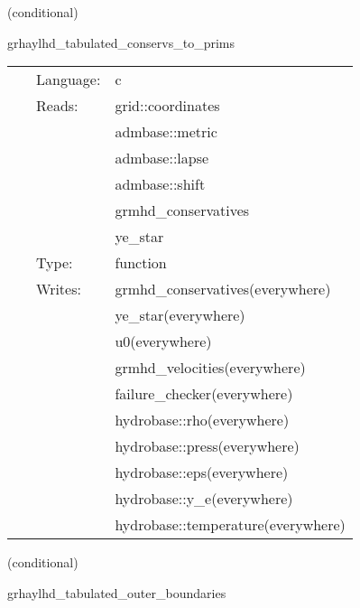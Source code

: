 \vspace{5mm}

   (conditional) 

\hspace{5mm} grhaylhd\_tabulated\_conservs\_to\_prims 

\hspace{5mm}{\it tabulated version of grhaylhd\_conservs\_to\_prims } 


\hspace{5mm}

 \begin{tabular*}{160mm}{cll} 
~ & Language:  & c \\ 
~ & Reads:  & grid::coordinates \\ 
~& ~ &admbase::metric\\ 
~& ~ &admbase::lapse\\ 
~& ~ &admbase::shift\\ 
~& ~ &grmhd\_conservatives\\ 
~& ~ &ye\_star\\ 
~ & Type:  & function \\ 
~ & Writes:  & grmhd\_conservatives(everywhere) \\ 
~& ~ &ye\_star(everywhere)\\ 
~& ~ &u0(everywhere)\\ 
~& ~ &grmhd\_velocities(everywhere)\\ 
~& ~ &failure\_checker(everywhere)\\ 
~& ~ &hydrobase::rho(everywhere)\\ 
~& ~ &hydrobase::press(everywhere)\\ 
~& ~ &hydrobase::eps(everywhere)\\ 
~& ~ &hydrobase::y\_e(everywhere)\\ 
~& ~ &hydrobase::temperature(everywhere)\\ 
\end{tabular*} 


\vspace{5mm}

   (conditional) 

\hspace{5mm} grhaylhd\_tabulated\_outer\_boundaries 

\hspace{5mm}{\it tabulated version of grhaylhd\_outer\_boundaries } 


\hspace{5mm}

